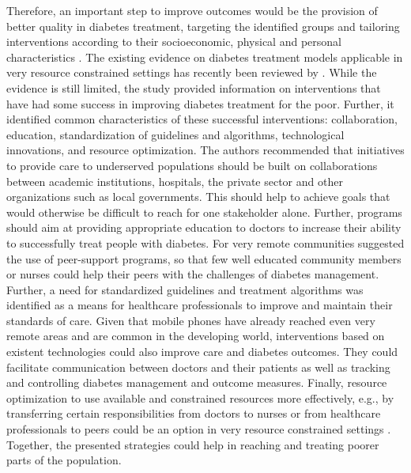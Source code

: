 Therefore, an important step to improve outcomes would be the provision of better quality in diabetes treatment, targeting the identified groups and tailoring interventions according to their socioeconomic, physical and personal characteristics \parencite{Cefalu2016}. The existing evidence on diabetes treatment models applicable in very resource constrained settings has recently been reviewed by \textcite{Esterson2014}. While the evidence is still limited, the study provided information on interventions that have had some success in improving diabetes treatment for the poor. Further, it identified common characteristics of these successful interventions: collaboration, education, standardization of guidelines and algorithms, technological innovations, and resource optimization. The authors recommended that initiatives to provide care to underserved populations should be built on collaborations between academic institutions, hospitals, the private sector and other organizations such as local governments. This should help to achieve goals that would otherwise be difficult to reach for one stakeholder alone. Further, programs should aim at providing appropriate education to doctors to increase their ability to successfully treat people with diabetes. For very remote communities \textcite{Esterson2014} suggested the use of peer-support programs, so that few well educated community members or nurses could help their peers with the challenges of diabetes management. Further, a need for standardized guidelines and treatment algorithms was identified as a means for healthcare professionals to improve and maintain their standards of care. Given that mobile phones have already reached even very remote areas and are common in the developing world, interventions based on existent technologies could also improve care and diabetes outcomes. They could facilitate communication between doctors and their patients as well as tracking and controlling diabetes management and outcome measures. Finally, resource optimization to use available and constrained resources more effectively, e.g., by transferring certain responsibilities from doctors to nurses or from healthcare professionals to peers could be an option in very resource constrained settings \parencite{Esterson2014}. Together, the presented strategies could help in reaching and treating poorer parts of the population.

